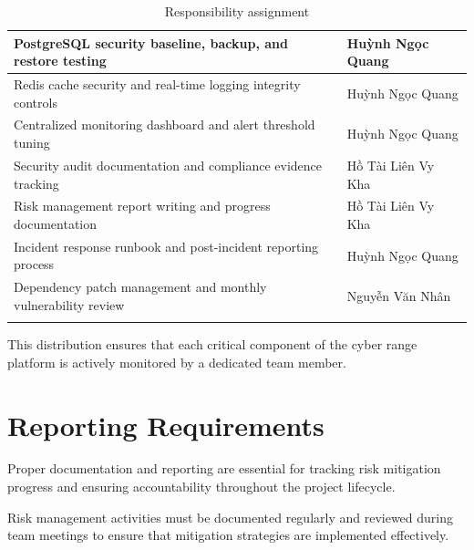 \begin{longtable}{|p{}|p{}|}
    \hline
    PostgreSQL security baseline, backup, and restore testing & Huỳnh Ngọc Quang \\
    \hline
    Redis cache security and real-time logging integrity controls & Huỳnh Ngọc Quang \\
    \hline
    Centralized monitoring dashboard and alert threshold tuning & Huỳnh Ngọc Quang \\
    \hline
    Security audit documentation and compliance evidence tracking & Hồ Tài Liên Vy Kha \\
    \hline
    Risk management report writing and progress documentation & Hồ Tài Liên Vy Kha \\
    \hline
    Incident response runbook and post-incident reporting process & Huỳnh Ngọc Quang \\
    \hline
    Dependency patch management and monthly vulnerability review & Nguyễn Văn Nhân \\
    \hline
    \caption{Responsibility assignment} \\
\end{longtable}
\vspace{\baselineskip}

This distribution ensures that each critical component of the cyber range platform is actively monitored by a dedicated team member.

\section{Reporting Requirements}
Proper documentation and reporting are essential for tracking risk mitigation progress and ensuring accountability throughout the project lifecycle.

Risk management activities must be documented regularly and reviewed during team meetings to ensure that mitigation strategies are implemented effectively.

